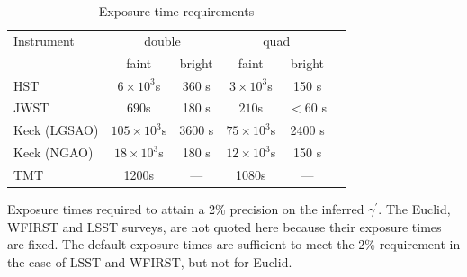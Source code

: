 \documentclass[a4paper,11pt]{article}
\begin{document}
\begin{table}\footnotesize
\begin{center}
\caption{Exposure time requirements}
\begin{tabular}{lccccc|}
\hline \hline
Instrument & \multicolumn{2}{c}{double} & \multicolumn{2}{c}{quad} \\
  & faint  & bright &  faint  &  bright \\
\hline
  HST   & $6\times10^3$s & 360 s  & $3\times10^3$s & 150 s \\
  JWST   & $690$s & 180 s  & $210$s & $<$60 s \\
  Keck (LGSAO)   & $105\times10^3$s & 3600 s  & $75\times10^3$s & 2400 s \\
  Keck (NGAO)   & $18\times10^3$s & 180 s  & $12\times10^3$s & 150 s \\
  TMT   &  1200s  &  ---   &   1080s   &  ---  \\
\hline
\hline
\end{tabular}
\begin{tablenotes}
\item
Exposure times required to attain a 2\% precision on the inferred $\gamma^\prime.$
 The Euclid, WFIRST and LSST surveys, are not quoted here because their exposure times are fixed. The default exposure times are sufficient to meet the 2\% requirement in the case of LSST and WFIRST, but not for Euclid.\\
\end{tablenotes}
\label{tab:exptimes}
\end{center}
\end{table}
\end{document}
